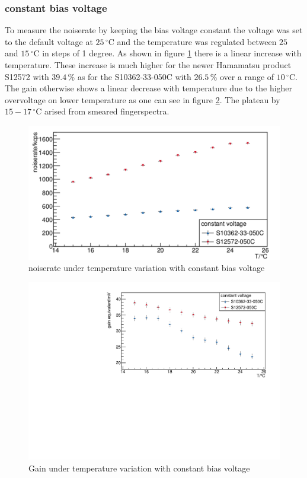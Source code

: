 \subsubsection{constant bias voltage}
To measure the noiserate by keeping the bias voltage constant the voltage was set to the default voltage at $25\,\mathrm{^{\circ}C}$ and the temperature was regulated between $25$ and $15\,\mathrm{^{\circ}C}$ in steps of 1 degree. As shown in figure \ref{constVolt_rate} there is a linear increase with temperature. These increase is much higher for the newer Hamamatsu product S12572 with $39.4\,\mathrm{\%}$ as for the S10362-33-050C with $26.5\,\mathrm{\%}$ over a range of $10\,\mathrm{^{\circ}C}$. 
The gain otherwise shows a linear decrease with temperature due to the higher overvoltage on lower temperature as one can see in figure \ref{constVolt_gain}. The plateau by $15 - 17\,\mathrm{^{\circ}C}$ arised from smeared fingerspectra.  
\begin{figure}[h]
	\centering
	\includegraphics[width = 0.75 \textwidth]{Figures/radermacher/ConstVolt_Rate_linear.pdf}
	\caption{noiserate under temperature variation with constant bias voltage}
	\label{constVolt_rate}
\end{figure}
\begin{figure}[h]
	\centering
	\includegraphics[width = 0.75 \textwidth]{Figures/radermacher/constVolt_Gain.pdf}
	\caption{Gain under temperature variation with constant bias voltage}
	\label{constVolt_gain}
\end{figure}
